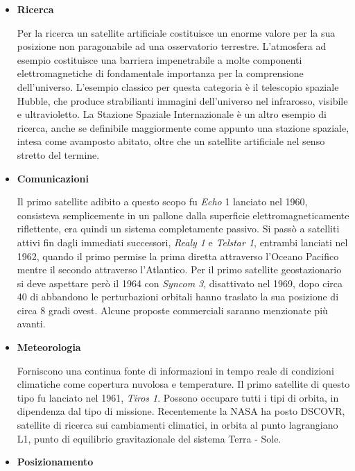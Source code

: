 \documentclass[12pt,a4paper,oneside]{book}
\begin{document}
			\begin{itemize}
				\item {\bf Ricerca}
				
				Per la ricerca un satellite artificiale costituisce un enorme valore per la sua posizione non paragonabile ad una osservatorio terrestre. L'atmosfera ad esempio costituisce una barriera impenetrabile a molte componenti elettromagnetiche di fondamentale importanza per la comprensione dell'universo. L'esempio classico per questa categoria è il telescopio spaziale Hubble, che produce strabilianti immagini dell'universo nel infrarosso, visibile e ultravioletto. La Stazione Spaziale Internazionale è un altro esempio di ricerca, anche se definibile maggiormente come appunto una stazione spaziale, intesa come avamposto abitato, oltre che un satellite artificiale nel senso stretto del termine.
				
				\item {\bf Comunicazioni}
				
				Il primo satellite adibito a questo scopo fu {\it Echo} 1 lanciato nel 1960, consisteva semplicemente in un pallone dalla superficie elettromagneticamente riflettente, era quindi un sistema completamente passivo. Si passò a satelliti attivi fin dagli immediati successori, {\it Realy 1} e {\it Telstar 1}, entrambi lanciati nel 1962, quando il primo permise la prima diretta attraverso l'Oceano Pacifico mentre il secondo attraverso l'Atlantico. Per il primo satellite geostazionario si deve aspettare però il 1964 con {\it Syncom 3}, disattivato nel 1969, dopo circa 40 di abbandono le perturbazioni orbitali hanno traslato la sua posizione di circa 8 gradi ovest. Alcune proposte commerciali saranno menzionate più avanti.
				
				\item {\bf Meteorologia}
				
				Forniscono una continua fonte di informazioni in tempo reale di condizioni climatiche come copertura nuvolosa e temperature. Il primo satellite di questo tipo fu lanciato nel 1961, {\it Tiros 1}. Possono occupare tutti i tipi di orbita, in dipendenza dal tipo di missione. Recentemente la NASA ha posto DSCOVR, satellite di ricerca sui cambiamenti climatici, in orbita al punto lagrangiano L1, punto di equilibrio gravitazionale del sistema Terra - Sole.
				
				\item {\bf Posizionamento}
				

\end{itemize}
\end{document}

